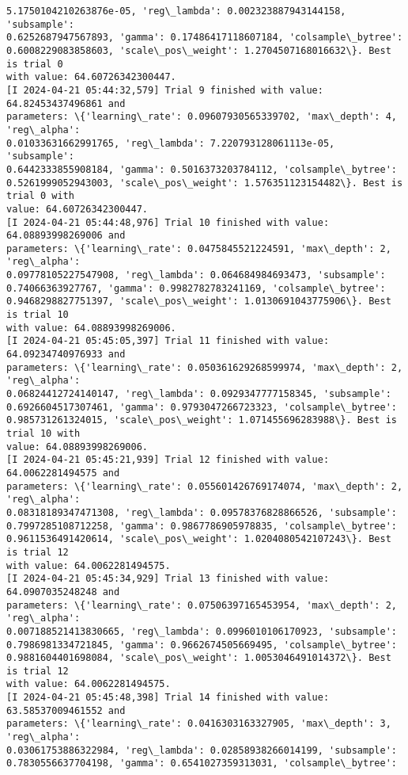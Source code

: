 \documentclass[11pt]{article}
\begin{document}
\begin{Verbatim}[commandchars=\\\{\}]
5.1750104210263876e-05, 'reg\_lambda': 0.002323887943144158, 'subsample':
0.6252687947567893, 'gamma': 0.17486417118607184, 'colsample\_bytree':
0.6008229083858603, 'scale\_pos\_weight': 1.2704507168016632\}. Best is trial 0
with value: 64.60726342300447.
[I 2024-04-21 05:44:32,579] Trial 9 finished with value: 64.82453437496861 and
parameters: \{'learning\_rate': 0.09607930565339702, 'max\_depth': 4, 'reg\_alpha':
0.01033631662991765, 'reg\_lambda': 7.220793128061113e-05, 'subsample':
0.6442333855908184, 'gamma': 0.5016373203784112, 'colsample\_bytree':
0.5261999052943003, 'scale\_pos\_weight': 1.576351123154482\}. Best is trial 0 with
value: 64.60726342300447.
[I 2024-04-21 05:44:48,976] Trial 10 finished with value: 64.08893998269006 and
parameters: \{'learning\_rate': 0.0475845521224591, 'max\_depth': 2, 'reg\_alpha':
0.09778105227547908, 'reg\_lambda': 0.064684984693473, 'subsample':
0.74066363927767, 'gamma': 0.9982782783241169, 'colsample\_bytree':
0.9468298827751397, 'scale\_pos\_weight': 1.0130691043775906\}. Best is trial 10
with value: 64.08893998269006.
[I 2024-04-21 05:45:05,397] Trial 11 finished with value: 64.09234740976933 and
parameters: \{'learning\_rate': 0.050361629268599974, 'max\_depth': 2, 'reg\_alpha':
0.06824412724140147, 'reg\_lambda': 0.0929347777158345, 'subsample':
0.6926604517307461, 'gamma': 0.9793047266723323, 'colsample\_bytree':
0.985731261324015, 'scale\_pos\_weight': 1.071455696283988\}. Best is trial 10 with
value: 64.08893998269006.
[I 2024-04-21 05:45:21,939] Trial 12 finished with value: 64.0062281494575 and
parameters: \{'learning\_rate': 0.055601426769174074, 'max\_depth': 2, 'reg\_alpha':
0.08318189347471308, 'reg\_lambda': 0.09578376828866526, 'subsample':
0.7997285108712258, 'gamma': 0.9867786905978835, 'colsample\_bytree':
0.9611536491420614, 'scale\_pos\_weight': 1.0204080542107243\}. Best is trial 12
with value: 64.0062281494575.
[I 2024-04-21 05:45:34,929] Trial 13 finished with value: 64.0907035248248 and
parameters: \{'learning\_rate': 0.07506397165453954, 'max\_depth': 2, 'reg\_alpha':
0.007188521413830665, 'reg\_lambda': 0.0996010106170923, 'subsample':
0.7986981334721845, 'gamma': 0.9662674505669495, 'colsample\_bytree':
0.9881604401698084, 'scale\_pos\_weight': 1.0053046491014372\}. Best is trial 12
with value: 64.0062281494575.
[I 2024-04-21 05:45:48,398] Trial 14 finished with value: 63.58537009461552 and
parameters: \{'learning\_rate': 0.0416303163327905, 'max\_depth': 3, 'reg\_alpha':
0.03061753886322984, 'reg\_lambda': 0.02858938266014199, 'subsample':
0.7830556637704198, 'gamma': 0.6541027359313031, 'colsample\_bytree':

\end{Verbatim}
\end{document}
